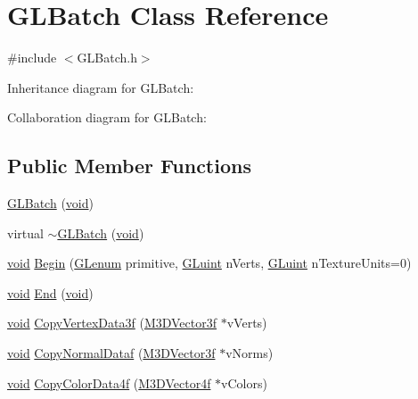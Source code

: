 \hypertarget{class_g_l_batch}{\section{G\-L\-Batch Class Reference}
\label{class_g_l_batch}
}


{\ttfamily \#include $<$G\-L\-Batch.\-h$>$}



Inheritance diagram for G\-L\-Batch\-:


Collaboration diagram for G\-L\-Batch\-:
\subsection*{Public Member Functions}
\begin{DoxyCompactItemize}
\item 
\hyperlink{class_g_l_batch_a7679be7672bc87556f3cadeaa420caa3}{G\-L\-Batch} (\hyperlink{_s_d_l__opengl_8h_a3db05964a3cc4410f35b7ea2b7eb850d}{void})
\item 
virtual \hyperlink{class_g_l_batch_a5c788165061a0e0fc1eae216f2a39673}{$\sim$\-G\-L\-Batch} (\hyperlink{_s_d_l__opengl_8h_a3db05964a3cc4410f35b7ea2b7eb850d}{void})
\item 
\hyperlink{_s_d_l__opengl_8h_a3db05964a3cc4410f35b7ea2b7eb850d}{void} \hyperlink{class_g_l_batch_afc8be91c4c00241706a58ea1cde35f0d}{Begin} (\hyperlink{_g_l_e_w_2glew_8h_a5d5233918a454ad3975c620a69ac5f0b}{G\-Lenum} primitive, \hyperlink{_g_l_e_w_2glew_8h_a68c4714e43d8e827d80759f9cb864f3c}{G\-Luint} n\-Verts, \hyperlink{_g_l_e_w_2glew_8h_a68c4714e43d8e827d80759f9cb864f3c}{G\-Luint} n\-Texture\-Units=0)
\item 
\hyperlink{_s_d_l__opengl_8h_a3db05964a3cc4410f35b7ea2b7eb850d}{void} \hyperlink{class_g_l_batch_a9b44a839193bab07aad1711f79e60be7}{End} (\hyperlink{_s_d_l__opengl_8h_a3db05964a3cc4410f35b7ea2b7eb850d}{void})
\item 
\hyperlink{_s_d_l__opengl_8h_a3db05964a3cc4410f35b7ea2b7eb850d}{void} \hyperlink{class_g_l_batch_af682faebb25798e311a45c267c897307}{Copy\-Vertex\-Data3f} (\hyperlink{math3d_8h_a2163fe22bd4208b846d22ec7e74cf858}{M3\-D\-Vector3f} $\ast$v\-Verts)
\item 
\hyperlink{_s_d_l__opengl_8h_a3db05964a3cc4410f35b7ea2b7eb850d}{void} \hyperlink{class_g_l_batch_ab877c7b2b01c150b33c28c7536ce4769}{Copy\-Normal\-Dataf} (\hyperlink{math3d_8h_a2163fe22bd4208b846d22ec7e74cf858}{M3\-D\-Vector3f} $\ast$v\-Norms)
\item 
\hyperlink{_s_d_l__opengl_8h_a3db05964a3cc4410f35b7ea2b7eb850d}{void} \hyperlink{class_g_l_batch_a367b3b10830aa5f099893e091ff2d738}{Copy\-Color\-Data4f} (\hyperlink{math3d_8h_a7da2e6b342ba064a875bf5bfc5dadb6f}{M3\-D\-Vector4f} $\ast$v\-Colors)

\end{DoxyCompactItemize}
